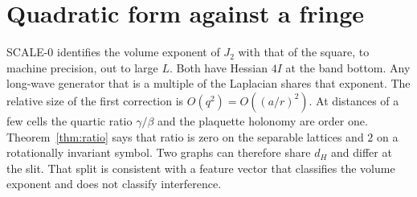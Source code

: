 \section{Quadratic form against a fringe}
\label{sec:h-dimuniv}

SCALE-0 identifies the volume exponent of \(J_2\) with that of the square,
to machine precision, out to large \(L\).
Both have Hessian \(4I\) at the band bottom.
Any long-wave generator that is a multiple of the Laplacian shares that
exponent.
The relative size of the first correction is \(O(q^2)=O((a/r)^2)\).
At distances of a few cells the quartic ratio \(\gamma/\beta\) and the
plaquette holonomy are order one.
Theorem~\ref{thm:ratio} says that ratio is zero on the separable lattices
and \(2\) on a rotationally invariant symbol.
Two graphs can therefore share \(d_H\) and differ at the slit.
That split is consistent with a feature vector that classifies the volume
exponent and does not classify interference.
